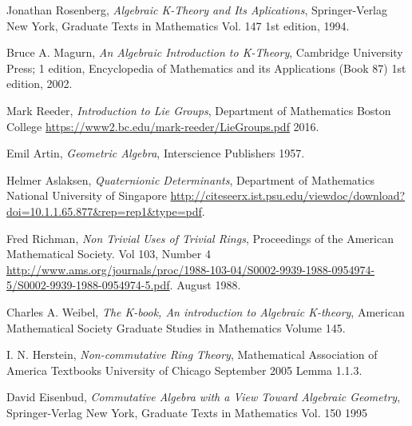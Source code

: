 \documentclass[
11pt, %
catalan, %
singlespacing, %
headsepline, %
consistentlayout, %
]{MastersDoctoralThesis} %
\theoremstyle{definition}
\begin{document}
\begin{thebibliography}{9}

  Jonathan Rosenberg,
  \emph{Algebraic K-Theory and Its Aplications},
  Springer-Verlag New York,
  Graduate Texts in Mathematics Vol. 147
  1st edition,
  1994.

  Bruce A. Magurn,
  \emph{An Algebraic Introduction to K-Theory},
  Cambridge University Press; 1 edition,
  Encyclopedia of Mathematics and its Applications (Book 87)
  1st edition,
  2002.
   
  Mark Reeder,
  \emph{Introduction to Lie Groups},
  Department of Mathematics 
  Boston College
  \url{https://www2.bc.edu/mark-reeder/LieGroups.pdf}
  2016.
  
  Emil Artin,
  \emph{Geometric Algebra},
  Interscience Publishers
  1957.
  
  Helmer Aslaksen,
  \emph{Quaternionic Determinants},
  Department of Mathematics 
  National University of Singapore
  \url{http://citeseerx.ist.psu.edu/viewdoc/download?doi=10.1.1.65.877&rep=rep1&type=pdf}.
  
  Fred Richman,
  \emph{Non Trivial Uses of Trivial Rings},
  Proceedings of the American Mathematical Society.
  Vol 103, Number 4
  \url{http://www.ams.org/journals/proc/1988-103-04/S0002-9939-1988-0954974-5/S0002-9939-1988-0954974-5.pdf}.
  August 1988.

  Charles A. Weibel,
  \emph{The K-book, An introduction to Algebraic K-theory},
  American Mathematical Society
  Graduate Studies in Mathematics Volume 145.
  
   I. N. Herstein,
  \emph{Non-commutative Ring Theory},
  Mathematical Association of America Textbooks
 University of Chicago
 September 2005
 Lemma 1.1.3.
 
   David Eisenbud,
  \emph{Commutative Algebra with a View Toward Algebraic Geometry},
  Springer-Verlag New York,
  Graduate Texts in Mathematics Vol. 150
 1995


\end{thebibliography}
\end{document}
